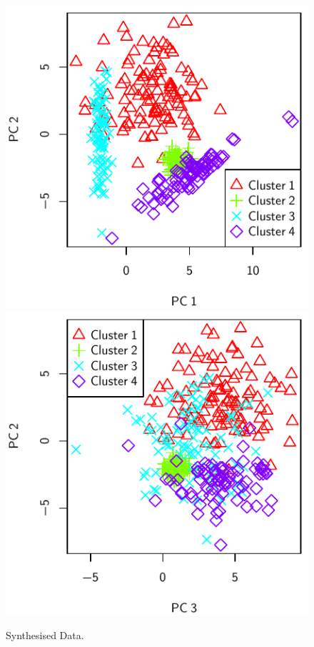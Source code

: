 			\begin{figure}[h!]
				\centering
				\subfloat
				{
					\includegraphics{chapter4/Images/ArtificialData1-2.pdf}
					\label{fig:EqualiserDifferencePCA}
				}
				\quad
				\subfloat
				{
					\includegraphics{chapter4/Images/ArtificialData3-2.pdf}
					\label{fig:EqualiserDifferenceCentroidsPCA}
				}
				\caption{Synthesised Data.}
				\label{fig:SynthesisedData}
			\end{figure}

